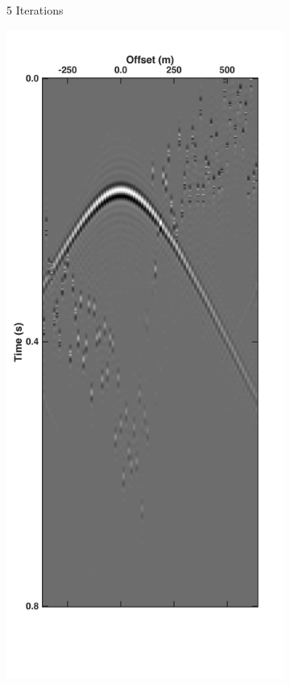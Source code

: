 \begin{figure}
\begin{subfigure}[t]{0.25\textwidth}
		\caption{5 Iterations}
		\label{fig:Ch-Theory-DeblendedCRG5}
	\end{subfigure}
	\begin{subfigure}[t]{0.25\textwidth}
		\includegraphics[width=\textwidth]{Plots/Mahdad/10iter/DeblendedCRG_rec30}	

\end{subfigure}
\end{figure}
